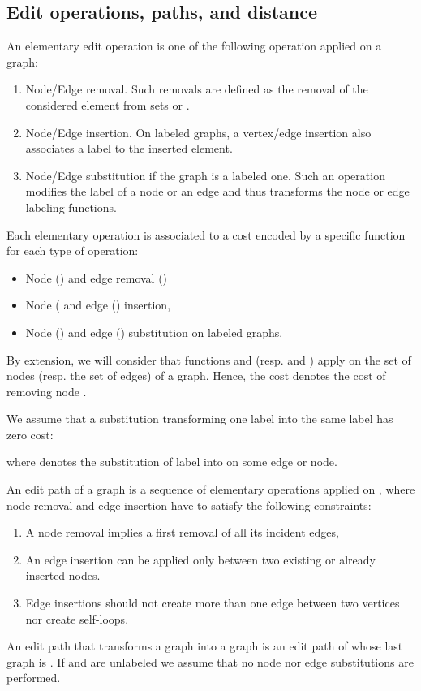 \subsection{Edit operations, paths, and distance}\label{sec:mainDefEditDist}
\begin{definition}\label{def:elEditOp}  
  An elementary edit operation is one of the following operation
  applied on a graph:
  \begin{enumerate}
  \item[] Node/Edge removal. Such removals are defined as the
    removal of the considered element from sets  or .
  \item[] Node/Edge insertion. On labeled graphs, a vertex/edge
    insertion also associates a label to the inserted element.
  \item[] Node/Edge substitution if the graph is a labeled one.
    Such an operation modifies the label of a node or an edge and
    thus transforms the node or edge labeling functions.
  \end{enumerate}
\end{definition}
\begin{definition}\label{def:elEdOpCost}
  Each elementary operation  is associated to a cost encoded by a
  specific function for each type of operation:
  \begin{itemize}
  \item Node () and edge removal ()
  \item Node ( and edge () insertion,
  \item Node () and edge () substitution on labeled graphs.
  \end{itemize}
  By extension, we will consider that functions  and
   (resp.  and ) apply on the set of nodes
  (resp. the set of edges) of a graph. Hence, the cost 
  denotes the cost of removing node .

  We assume that a substitution transforming one label into the same
  label has zero cost: 
  
  where  denotes the substitution of label  into
   on some edge or node.
\end{definition}
\begin{definition}\label{def:editPath}
  An edit path of a graph  is a sequence of elementary
    operations applied on , where node removal and edge
    insertion have to satisfy the following constraints:
    \begin{enumerate}
    \item\label{item:vertexremov} A node removal implies a first removal of all its incident
      edges,
    \item\label{item:edgeinsertion} An edge insertion can be applied
      only between two existing or already inserted nodes. 
    \item\label{item:simplegraph} Edge insertions should not create
      more than one edge between two vertices nor create self-loops.
    \end{enumerate}
  An edit path that transforms a graph  into a graph  is an edit
    path of  whose last graph is . If  and  are unlabeled we assume that no node nor edge
  substitutions are performed.
\end{definition}

